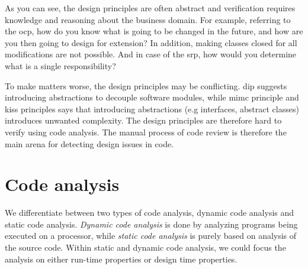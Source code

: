 \documentclass{report}
\begin{document}
As you can see, the design principles are often abstract and verification requires knowledge and reasoning about the business domain. For example, referring to the \gls{ocp}, how do you know what is going to be changed in the future, and how are you then going to design for extension? In addition, making classes closed for all modifications are not possible. And in case of the \gls{srp}, how would you determine what is a single responsibility? 

To make matters worse, the design principles may  be conflicting. \gls{dip} suggests introducing abstractions to decouple software modules, while \gls{mimc} principle and \gls{kiss} principles says that introducing abstractions (e.g interfaces, abstract classes) introduces unwanted complexity. The design principles are therefore hard to verify using code analysis. The manual process of code review is therefore the main arena for detecting design issues in code.

\section{Code analysis}
\label{code-analysis}
We differentiate between two types of code analysis, dynamic code analysis and static code analysis. \textit{Dynamic code analysis} is done by analyzing programs being executed on a processor, while \textit{static code analysis} is purely based on analysis of the source code. Within static and dynamic code analysis, we could focus the analysis on either run-time properties or design time properties.
\end{document}
